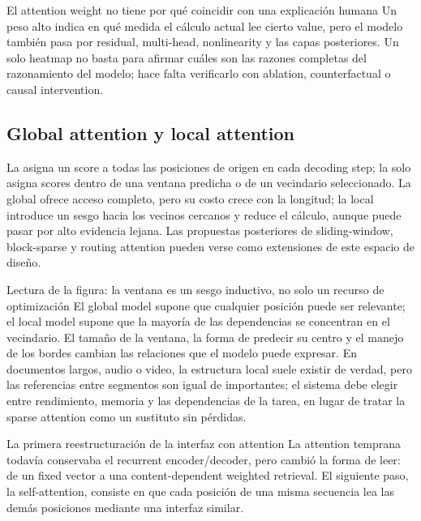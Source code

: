 \begin{warningbox}{El attention weight no tiene por qué coincidir con una explicación humana}
Un peso alto indica en qué medida el cálculo actual lee cierto value, pero el modelo también pasa por residual, multi-head, nonlinearity y las capas posteriores. Un solo heatmap no basta para afirmar cuáles son las razones completas del razonamiento del modelo; hace falta verificarlo con ablation, counterfactual o causal intervention.
\end{warningbox}

\subsection{Global attention y local attention}

La  asigna un score a todas las posiciones de origen en cada decoding step; la  solo asigna scores dentro de una ventana predicha o de un vecindario seleccionado. La global ofrece acceso completo, pero su costo crece con la longitud; la local introduce un sesgo hacia los vecinos cercanos y reduce el cálculo, aunque puede pasar por alto evidencia lejana. Las propuestas posteriores de sliding-window, block-sparse y routing attention pueden verse como extensiones de este espacio de diseño.


\begin{knowledgebox}{Lectura de la figura: la ventana es un sesgo inductivo, no solo un recurso de optimización}
El global model supone que cualquier posición puede ser relevante; el local model supone que la mayoría de las dependencias se concentran en el vecindario. El tamaño de la ventana, la forma de predecir su centro y el manejo de los bordes cambian las relaciones que el modelo puede expresar. En documentos largos, audio o video, la estructura local suele existir de verdad, pero las referencias entre segmentos son igual de importantes; el sistema debe elegir entre rendimiento, memoria y las dependencias de la tarea, en lugar de tratar la sparse attention como un sustituto sin pérdidas.
\end{knowledgebox}

\begin{importantbox}{La primera reestructuración de la interfaz con attention}
La attention temprana todavía conservaba el recurrent encoder/decoder, pero cambió la forma de leer: de un fixed vector a una content-dependent weighted retrieval. El siguiente paso, la self-attention, consiste en que cada posición de una misma secuencia lea las demás posiciones mediante una interfaz similar.
\end{importantbox}

